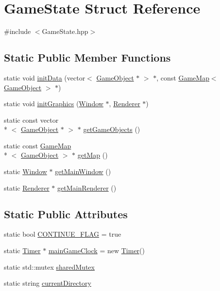 \hypertarget{struct_game_state}{\section{Game\-State Struct Reference}
\label{struct_game_state}
}


{\ttfamily \#include $<$Game\-State.\-hpp$>$}

\subsection*{Static Public Member Functions}
\begin{DoxyCompactItemize}
\item 
static void \hyperlink{struct_game_state_a8ed9965a2ad3bf68c0555c9669952368}{init\-Data} (vector$<$ \hyperlink{class_game_object}{Game\-Object} $\ast$ $>$ $\ast$, const \hyperlink{class_game_map}{Game\-Map}$<$ \hyperlink{class_game_object}{Game\-Object} $>$ $\ast$)
\item 
static void \hyperlink{struct_game_state_afc3662cfa5b520a915d19f050eabb720}{init\-Graphics} (\hyperlink{_default_config_8h_a12f0b3ea7a02ede1c5799a956e008406}{Window} $\ast$, \hyperlink{_default_config_8h_a15987d3f97f19077ea40d858c2f0b836}{Renderer} $\ast$)
\item 
static const vector\\*
$<$ \hyperlink{class_game_object}{Game\-Object} $\ast$ $>$ $\ast$ \hyperlink{struct_game_state_ae1b4a46f267c8b03a7b4b036d2ba24f5}{get\-Game\-Objects} ()
\item 
static const \hyperlink{class_game_map}{Game\-Map}\\*
$<$ \hyperlink{class_game_object}{Game\-Object} $>$ $\ast$ \hyperlink{struct_game_state_af5f38e58dfaedb66f6c4b6b6ce140d1a}{get\-Map} ()
\item 
static \hyperlink{_default_config_8h_a12f0b3ea7a02ede1c5799a956e008406}{Window} $\ast$ \hyperlink{struct_game_state_a62430ef1e6a2e0818f7c18071cfea71d}{get\-Main\-Window} ()
\item 
static \hyperlink{_default_config_8h_a15987d3f97f19077ea40d858c2f0b836}{Renderer} $\ast$ \hyperlink{struct_game_state_a590988c72da8823ed14b4be284262467}{get\-Main\-Renderer} ()
\end{DoxyCompactItemize}
\subsection*{Static Public Attributes}
\begin{DoxyCompactItemize}
\item 
static bool \hyperlink{struct_game_state_a58ee23ac0938d8499250b971f8e1d2d0}{C\-O\-N\-T\-I\-N\-U\-E\-\_\-\-F\-L\-A\-G} = true
\item 
static \hyperlink{class_timer}{Timer} $\ast$ \hyperlink{struct_game_state_a5e5f91123aacc5e7fa22ddefdb3cd256}{main\-Game\-Clock} = new \hyperlink{class_timer}{Timer}()
\item 
static std\-::mutex \hyperlink{struct_game_state_a0d889afebf6eea90f6d3212c29cf7451}{shared\-Mutex}
\item 
static string \hyperlink{struct_game_state_a0aad2a1111325f0345a511fe1665800a}{current\-Directory}
\end{DoxyCompactItemize}
